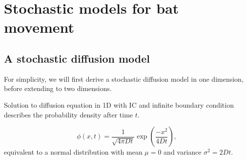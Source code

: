 
\chapter{Stochastic models for bat movement}


	\section{A stochastic diffusion model}

	For simplicity, we will first derive a stochastic diffusion model in one
	dimension, before extending to two dimensions.

	Solution to diffusion equation in 1D with IC and infinite boundary condition describes the probability
	density after time $t$.

	\begin{equation}
\phi(x,t) = \frac{1}{\sqrt{4\pi Dt}}\exp \left(\frac{-x^2}{4Dt} \right) ,
\label{eqn:diffusion_solution1d}
	\end{equation}
%
equivalent to a normal distribution with mean $\mu = 0$ and variance $\sigma^2 =
2Dt$.

